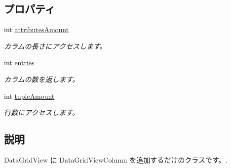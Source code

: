 \subsection*{プロパティ}
\begin{DoxyCompactItemize}
\item 
int \hyperlink{classlazurite_1_1pattern_1_1building_1_1_data_grid_view_column_builder_ad34b93f2213b632fec0bc01050b5a92f}{attributesAmount}
\begin{DoxyCompactList}\small\item\em カラムの長さにアクセスします。 \item\end{DoxyCompactList}\item 
int \hyperlink{classlazurite_1_1pattern_1_1building_1_1_data_grid_view_column_builder_a8f3dd634d9e186fdf25e27677a1502a3}{entries}
\begin{DoxyCompactList}\small\item\em カラムの数を返します。 \item\end{DoxyCompactList}\item 
int \hyperlink{classlazurite_1_1pattern_1_1building_1_1_data_grid_view_column_builder_a2fe5c2e6cc6915ece3cc97855a761c12}{tupleAmount}
\begin{DoxyCompactList}\small\item\em 行数にアクセスします。 \item\end{DoxyCompactList}\end{DoxyCompactItemize}


\subsection{説明}
DataGridView に DataGridViewColumn を追加するだけのクラスです。. 

